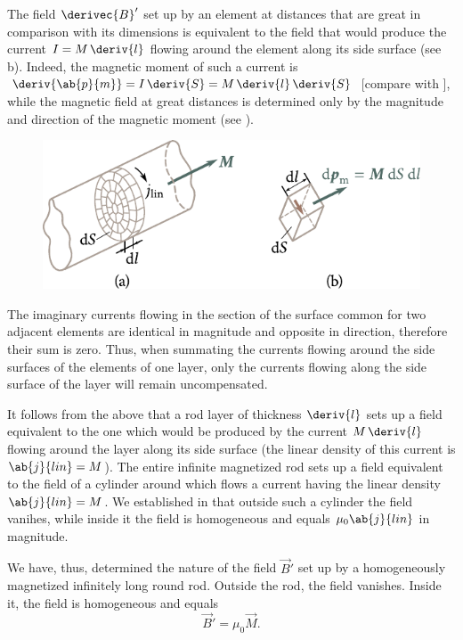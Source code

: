The field $\derivec{B}'$ set up by an element at distances that are great in comparison with its dimensions is equivalent to the field that would produce the current $I=M\,\deriv{l}$ flowing around the element along its side surface (see b).
Indeed, the magnetic moment of such a current is $\deriv{\ab{p}{m}}=I\,\deriv{S}=M\,\deriv{l}\,\deriv{S}$ [compare with ], while the magnetic field at great distances is determined only by the
magnitude and direction of the magnetic moment (see ).

\begin{figure}[!htb]
	\begin{center}
		\includegraphics[scale=1]{figures/ch_07/fig_7_4.pdf}
		\caption[]{}
		\label{fig:7_4}
	\end{center}
	\vspace{-0.8cm}
\end{figure}

The imaginary currents flowing in the section of the surface common for two adjacent elements are identical in magnitude and opposite in direction, therefore their sum is zero. Thus, when summating the currents flowing around the side surfaces of the elements of one layer, only the currents flowing along the side surface of the layer will remain uncompensated.

It follows from the above that a rod layer of thickness $\deriv{l}$ sets up a field equivalent to the one which would be produced by the current $M\,\deriv{l}$ flowing around the layer along its side surface (the linear density of this current is $\ab{j}{lin}=M$).
The entire infinite magnetized rod sets up a field equivalent to the field of a cylinder around which flows a current having the linear density $\ab{j}{lin}=M$. We established in  that outside such a cylinder the field vanihes, while inside it the field is homogeneous and equals $\mu_0\ab{j}{lin}$ in magnitude.

We have, thus, determined the nature of the field $\vec{B}'$ set up by a homogeneously magnetized infinitely long round rod.
Outside the rod, the field vanishes.
Inside it, the field is homogeneous and equals
\begin{equation}\label{eq:7_23}
    \vec{B}' = \mu_0 \vec{M}.
\end{equation}

